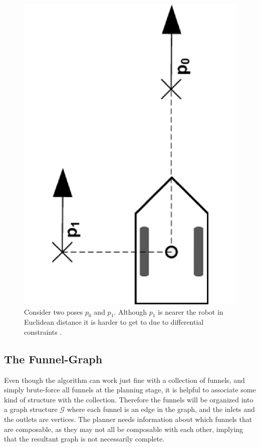 \begin{figure}
  \centering
  \includegraphics[scale=.2,angle=-90]{figures/rrtfunnel/non-holonomic-vehicle-euclidean-weakness}
  \caption[Distance metrics for non-holonomic vehicles]{Consider two poses
    \(p_0\) and \(p_1\). Although \(p_1\) is nearer the robot in Euclidean
    distance it is harder to get to due to differential constraints
    \textcite{parkFeedbackMotionPlanning2015}.}
  \label{fig:non-holonomic-vehicle-euclidean-weakness}
\end{figure}


\subsection{The Funnel-Graph}

Even though the \rrtfunnel{} algorithm can work just fine with a collection of
funnels, and simply brute-force all funnels at the planning stage, it is helpful
to associate some kind of structure with the collection. Therefore the funnels
will be organized into a graph structure \(\mathcal{G}\) where each funnel is an
edge in the graph, and the inlets and the outlets are vertices. The planner
needs information about which funnels that are composable, as they may not all
be composable with each other, implying that the resultant graph is not
necessarily complete.

